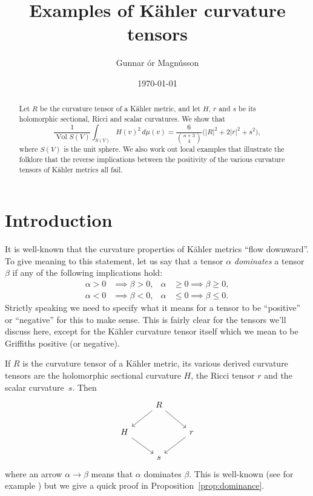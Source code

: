 \documentclass[10pt,a4paper]{amsart}
\author{Gunnar \TH\'or Magn\'usson}
\date{\today}
\title{Examples of K\"ahler curvature tensors}
\theoremstyle{definition}
\DeclareMathOperator{\Vol}{Vol}
\begin{document}
\begin{abstract}
Let $R$ be the curvature tensor of a K\"ahler metric, and let $H$, $r$ and $s$
be its holomorphic sectional, Ricci and scalar curvatures. We show that
$$
\frac{1}{\Vol S(V)} \int_{S(V)}
\!\!\!\!
H(v)^2 \, d\mu(v)
= \frac{6}{\binom{n+3}{4}} \bigl(
|R|^2 + 2 |r|^2 + s^2
\bigr),
$$
where $S(V)$ is the unit sphere.
We also work out local examples that illustrate the folklore that the reverse
implications between the positivity of the various curvature tensors of
K\"ahler metrics all fail.
\end{abstract}

\maketitle

\section{Introduction}

It is well-known that the curvature properties of K\"ahler metrics ``flow
downward''.
To give meaning to this statement,
let us say that a tensor $\alpha$ \emph{dominates} a tensor $\beta$
if any of the following implications hold:
\begin{align*}
\alpha > 0 &\implies \beta > 0,
&
\alpha &\geq 0 \implies \beta \geq 0,
\\
\alpha < 0 &\implies \beta < 0,
&
\alpha &\leq 0 \implies \beta \leq 0.
\end{align*}
Strictly speaking we need to specify what it means for a tensor to be
``positive'' or ``negative'' for this to make sense.
This is fairly clear for the tensors we'll discuss here, except for the
K\"ahler curvature tensor itself which we mean to be Griffiths positive (or
negative).

If $R$ is the curvature tensor of a K\"ahler metric, its various derived
curvature tensors are the holomorphic sectional curvature $H$, the Ricci
tensor $r$ and the scalar curvature~$s$.
Then
$$
\begin{tikzcd}
& R \ar[dl] \ar[dr] &
\\
H \ar[dr] & & r \ar[dl]
\\
& s &
\end{tikzcd}
$$
where an arrow $\alpha \to \beta$ means that $\alpha$ dominates $\beta$.
This is well-known (see for example \cite{zheng2000complex}) but we give a
quick proof in Proposition~\ref{prop:dominance}.
\end{document}
